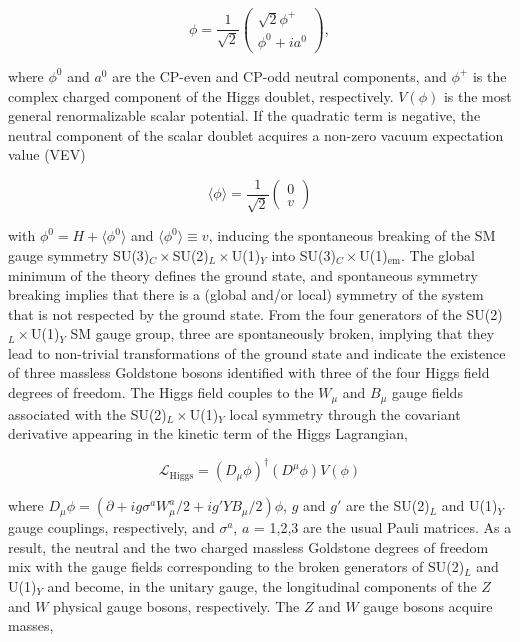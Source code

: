 \documentclass[12pt]{article}
\begin{document}
\begin{equation}
    \phi = \frac{1}{\sqrt{2}}
    \begin{pmatrix}
        \sqrt{2}\phi^+ \\
        \phi^0 + ia^0
    \end{pmatrix},
\end{equation}

where $\phi^0$ and $a^0$ are the CP-even and CP-odd neutral components, and $\phi^+$ is the complex charged component of the Higgs doublet, respectively. $V(\phi)$ is the most general renormalizable scalar potential. If the quadratic term is negative, the neutral component of the scalar doublet acquires a non-zero vacuum expectation value (VEV)

\begin{equation}
    \langle\phi\rangle = \frac{1}{\sqrt{2}}
    \begin{pmatrix}
        0 \\ v
    \end{pmatrix}
\end{equation}

with $\phi^0 = H+\langle\phi^0\rangle$ and $\langle\phi^0\rangle \equiv v$, inducing the spontaneous breaking of the SM gauge symmetry SU(3)$_C\times$SU(2)$_L\times$U(1)$_Y$ into SU(3)$_C\times$U(1)$_\text{em}$. The global minimum of the theory defines the ground state, and spontaneous symmetry breaking implies that there is a (global and/or local) symmetry of the system that is not respected by the ground state. From the four generators of the SU(2)$_L\times$U(1)$_Y$ SM gauge group, three are spontaneously broken, implying that they lead to non-trivial transformations of the ground state and indicate the existence of three massless Goldstone bosons identified with three of the four Higgs field degrees of freedom. The Higgs field couples to the $W_\mu$ and $B_\mu$ gauge fields associated with the SU(2)$_L\times$U(1)$_Y$ local symmetry through the covariant derivative appearing in the kinetic term of the Higgs Lagrangian,

\begin{equation}
    \mathcal{L}_\text{Higgs} = (D_\mu\phi)^\dagger(D^\mu\phi) V(\phi)
\end{equation}

where $D_\mu\phi=(\partial + ig\sigma^aW^a_\mu/2 + ig'YB_\mu/2)\phi$, $g$ and $g'$ are the SU(2)$_L$ and U(1)$_Y$ gauge couplings, respectively, and $\sigma^a$, $a$ = 1,2,3 are the usual Pauli matrices. As a result, the neutral and the two charged massless Goldstone degrees of freedom mix with the gauge fields corresponding to the broken generators of SU(2)$_L$ and U(1)$_Y$ and become, in the unitary gauge, the longitudinal components of the $Z$ and $W$ physical gauge bosons, respectively. The $Z$ and $W$ gauge bosons acquire masses,
\end{document}
